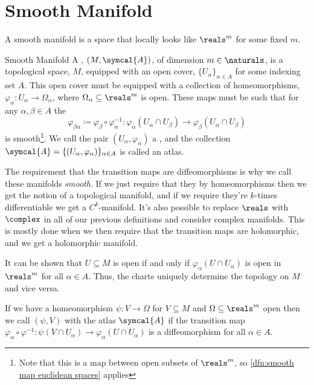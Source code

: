 \documentclass[fleqn]{NotesClass}
\newcommand{\atlas}{\symcal{A}}
\begin{document}
    \section{Smooth Manifold}
    A smooth manifold is a space that locally looks like \(\reals^m\) for some fixed \(m\).
    
    \begin{dfn}{Smooth Manifold}{}
        A , \((M, \atlas)\), of dimension \(m \in \naturals\), is a topological space, \(M\), equipped with an open cover, \(\{U_\alpha\}_{\alpha \in A}\) for some indexing set \(A\).
        This open cover must be equipped with a collection of homeomorphisms, \(\varphi_\alpha \colon U_\alpha \to \Omega_{\alpha}\), where \(\Omega_\alpha \subseteq \reals^m\) is open.
        These maps must be such that for any \(\alpha, \beta \in A\) the 
        \begin{equation}
            \varphi_{\beta \alpha} \coloneq \varphi_\beta \circ \varphi_\alpha^{-1} \colon \varphi_\alpha(U_\alpha \cap U_\beta) \to \varphi_\beta(U_\alpha \cap U_\beta)
        \end{equation}
        is smooth\footnote{Note that this is a map between open subsets of \(\reals^m\), so \cref{dfn:smooth map euclidean spaces} applies}.
        We call the pair \((U_\alpha, \varphi_\alpha)\) a , and the collection \(\atlas = \{(U_\alpha, \varphi_\alpha)\}_{\alpha \in A}\) is called an atlas.
    \end{dfn}
    
    The requirement that the transition maps are diffeomorphisms is why we call these manifolds \emph{smooth}.
    If we just require that they by homeomorphisms then we get the notion of a topological manifold, and if we require they're \(k\)-times differentiable we get a \(C^k\)-manifold.
    It's also possible to replace \(\reals\) with \(\complex\) in all of our previous definitions and consider complex manifolds.
    This is mostly done when we then require that the transition maps are holomorphic, and we get a holomorphic manifold.
    
    It can be shown that \(U \subseteq M\) is open if and only if \(\varphi_\alpha(U \cap U_\alpha)\) is open in \(\reals^m\) for all \(\alpha \in A\).
    Thus, the charts uniquely determine the topology on \(M\) and vice versa.
    
    If we have a homeomorphism \(\psi \colon V \to \Omega\) for \(V \subseteq M\) and \(\Omega \subseteq \reals^m\) open then we call \((\psi, V)\)  with the atlas \(\atlas\) if the transition map \(\varphi_\alpha \circ \varphi^{-1} \colon \psi(V \cap U_\alpha) \to \varphi_\alpha(U \cap U_\alpha)\) is a diffeomorphism for all \(\alpha \in A\).
    
\end{document}
